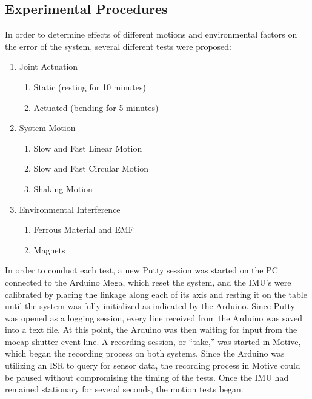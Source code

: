 \documentclass[letterpaper, 10 pt, conference]{ieeeconf}  %
\begin{document}
\subsection{Experimental Procedures}\label{subsection:experimentalProcedures}
In order to determine effects of different motions and environmental factors on the error of the system, several different tests were proposed:
\begin{enumerate}
\item Joint Actuation
  \begin{enumerate}
  \item Static (resting for 10 minutes)
  \item Actuated (bending for 5 minutes)
  \end{enumerate}
\item System Motion
  \begin{enumerate}
  \item Slow and Fast Linear Motion
  \item Slow and Fast Circular Motion
  \item Shaking Motion
  \end{enumerate}
\item Environmental Interference
  \begin{enumerate}
  \item Ferrous Material and EMF
  \item Magnets
  \end{enumerate}
\end{enumerate}

In order to conduct each test, a new Putty session was started on the PC connected to the Arduino Mega, which reset the system, and the IMU's were calibrated by placing the linkage along each of its axis and resting it on the table until the system was fully initialized as indicated by the Arduino. Since Putty was opened as a logging session, every line received from the Arduino was saved into a text file. At this point, the Arduino was then waiting for input from the mocap shutter event line. A recording session, or ``take,'' was started in Motive, which began the recording process on both systems. Since the Arduino was utilizing an ISR to query for sensor data, the recording process in Motive could be paused without compromising the timing of the tests. Once the IMU had remained stationary for several seconds, the motion tests began. 
\end{document}
